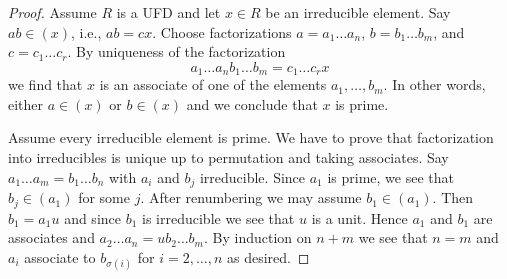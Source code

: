 \documentclass[10pt,a4paper]{amsart}
\theoremstyle{plain}
\theoremstyle{definition}
\theoremstyle{remark}
\numberwithin{equation}{subsection}
\begin{document}
\begin{proof}
Assume $R$ is a UFD and let $x \in R$ be an irreducible element.
Say $ab \in (x)$, i.e., $ab = cx$. Choose factorizations
$a = a_1 \ldots a_n$, $b = b_1 \ldots b_m$, and $c = c_1 \ldots c_r$.
By uniqueness of the factorization
$$
a_1 \ldots a_n b_1 \ldots b_m = c_1 \ldots c_r x
$$
we find that $x$ is an associate of one of the elements
$a_1, \ldots, b_m$. In other words, either $a \in (x)$ or $b \in (x)$
and we conclude that $x$ is prime.

\medskip\noindent
Assume every irreducible element is prime. We have to prove that
factorization into irreducibles is unique up to permutation and
taking associates. Say $a_1 \ldots a_m = b_1 \ldots b_n$ with $a_i$
and $b_j$ irreducible. Since $a_1$ is prime, we see that
$b_j \in (a_1)$ for some $j$. After renumbering we may assume
$b_1 \in (a_1)$. Then $b_1 = a_1 u$ and since $b_1$ is irreducible
we see that $u$ is a unit. Hence $a_1$ and $b_1$ are associates
and $a_2 \ldots a_n = ub_2\ldots b_m$. By induction on $n + m$
we see that $n = m$ and $a_i$ associate to $b_{\sigma(i)}$ for
$i = 2, \ldots, n$ as desired.
\end{proof}
\end{document}
